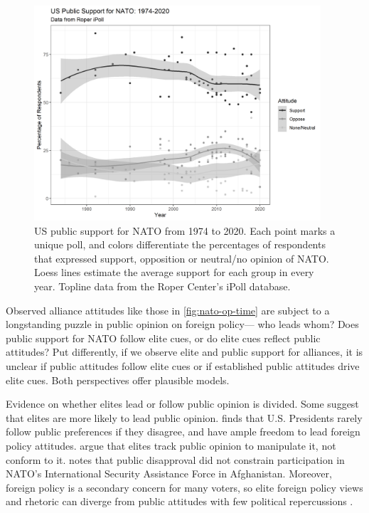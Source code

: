 \documentclass[12pt]{article}
\begin{document}
\begin{figure}
	\centering
		\includegraphics[width=0.95\textwidth]{../figures/nato-op-time.png}
	\caption{US public support for NATO from 1974 to 2020. Each point marks a unique poll, and colors differentiate the percentages of respondents that expressed support, opposition or neutral/no opinion of NATO. Loess lines estimate the average support for each group in every year. Topline data from the Roper Center's iPoll database.}
	\label{fig:nato-op-time}
\end{figure}


Observed alliance attitudes like those in \autoref{fig:nato-op-time} are subject to a longstanding puzzle in public opinion on foreign policy--- who leads whom? 
Does public support for NATO follow elite cues, or do elite cues reflect public attitudes?  
Put differently, if we observe elite and public support for alliances, it is unclear if public attitudes follow elite cues or if established public attitudes drive elite cues. 
Both perspectives offer plausible models. 


Evidence on whether elites lead or follow public opinion is divided.
Some suggest that elites are more likely to lead public opinion. 
\citet{Canes-Wrone2006} finds that U.S. Presidents rarely follow public preferences if they disagree, and have ample freedom to lead foreign policy attitudes. 
\citet{JacobsShapiro2000} argue that elites track public opinion to manipulate it, not conform to it. 
\citet{Kreps2010} notes that public disapproval did not constrain participation in NATO's International Security Assistance Force in Afghanistan. 
Moreover, foreign policy is a secondary concern for many voters, so elite foreign policy views and rhetoric can diverge from public attitudes with few political repercussions \citep{BusbyMonten2012}. 
\end{document}
